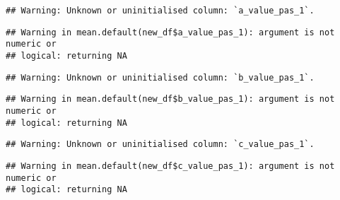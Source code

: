 \documentclass[
]{article}
\newenvironment{Shaded}{\begin{snugshade}}{\end{snugshade}}
\newcommand{\FunctionTok}[1]{\textcolor[rgb]{0.00,0.00,0.00}{#1}}
\newcommand{\NormalTok}[1]{#1}
\newcommand{\OtherTok}[1]{\textcolor[rgb]{0.56,0.35,0.01}{#1}}
\newcommand{\SpecialCharTok}[1]{\textcolor[rgb]{0.00,0.00,0.00}{#1}}
\begin{document}
\begin{verbatim}
## Warning: Unknown or uninitialised column: `a_value_pas_1`.
\end{verbatim}

\begin{verbatim}
## Warning in mean.default(new_df$a_value_pas_1): argument is not numeric or
## logical: returning NA
\end{verbatim}

\begin{Shaded}
\end{Shaded}

\begin{verbatim}
## Warning: Unknown or uninitialised column: `b_value_pas_1`.
\end{verbatim}

\begin{verbatim}
## Warning in mean.default(new_df$b_value_pas_1): argument is not numeric or
## logical: returning NA
\end{verbatim}

\begin{Shaded}
\end{Shaded}

\begin{verbatim}
## Warning: Unknown or uninitialised column: `c_value_pas_1`.
\end{verbatim}

\begin{verbatim}
## Warning in mean.default(new_df$c_value_pas_1): argument is not numeric or
## logical: returning NA
\end{verbatim}

\begin{Shaded}
\end{Shaded}
\end{document}

